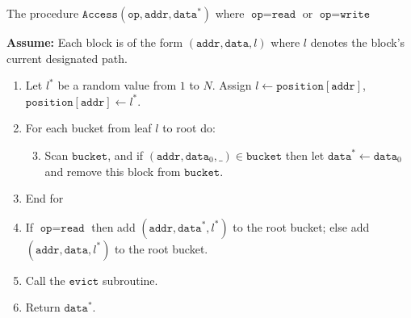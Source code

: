 
\iffalse
\begin{algo}
The procedure
$\texttt{Access}(\texttt{op},\texttt{addr},\texttt{data}^{*})$
where $\texttt{op} = \texttt{read}$ or
$\texttt{op} = \texttt{write}$

\textbf{Assume:} Each block is of the form
$( \texttt{addr},\texttt{data},l )$ where
$l$ denotes the block's current designated path.

\begin{enumerate}
\item
  Let $l^{*}$ be a random value from $1$ to $N$. Assign
  $l \leftarrow\texttt{position}\left[ \texttt{addr} \right]$,
  $\texttt{position}\left[ \texttt{addr} \right] \leftarrow l^{*}$.
\item
  For each bucket from leaf $l$ to root do:

  \begin{enumerate}
  \setcounter{enumii}{2}
  \item
    Scan $\texttt{bucket}$, and if
    $( \texttt{addr},\texttt{data}_{0},\_ ) \in \texttt{bucket}$
    then let
    $\texttt{data}^{*} \leftarrow \texttt{data}_{0}$ and
    remove this block from $\texttt{bucket}$.
  \end{enumerate}
\item
  End for
\item
  If $\texttt{op} = \texttt{read}$ then add
  $( \texttt{addr},\texttt{data}^{*},l^{*} )$
  to the root bucket; else add
  $( \texttt{addr},\texttt{data},l^{*} )$ to
  the root bucket.
\item
  Call the $\texttt{evict}$ subroutine.
\item
  Return $\texttt{data}^{*}$.
\end{enumerate}
\end{algo}

